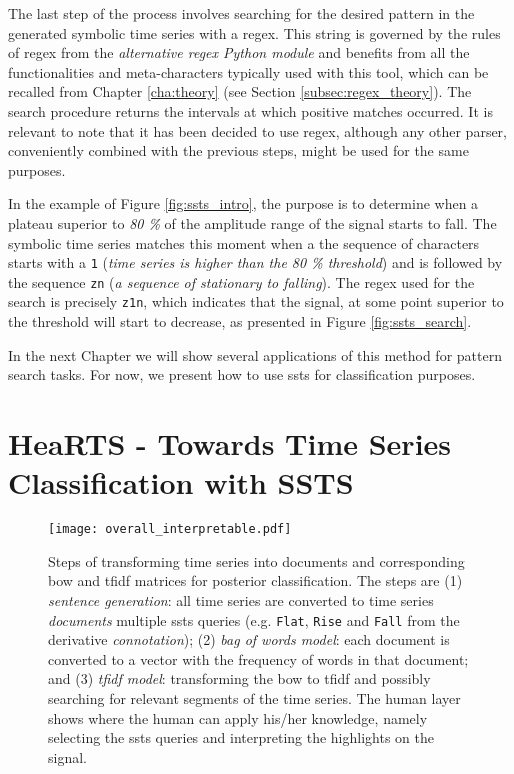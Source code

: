 The last step of the process involves searching for the desired pattern in the generated symbolic time series with a \gls{regex}. This string is governed by the rules of \gls{regex} from the \textit{alternative \gls{regex} Python module} \cite{rgxPy} and benefits from all the functionalities and meta-characters typically used with this tool, which can be recalled from Chapter \ref{cha:theory} (see Section \ref{subsec:regex_theory}). The search procedure returns the intervals at which positive matches occurred. It is relevant to note that it has been decided to use \gls{regex}, although any other parser, conveniently combined with the previous steps, might be used for the same purposes.
\par
In the example of Figure \ref{fig:ssts_intro}, the purpose is to determine when a plateau superior to \textit{80 \%} of the amplitude range of the signal starts to fall. The symbolic time series matches this moment when a the sequence of characters starts with a \texttt{1} (\textit{time series is higher than the 80 \% threshold}) and is followed by  the sequence \texttt{zn} (\textit{a sequence of stationary  to falling}). The \gls{regex} used for the search is precisely \texttt{z1n}, which indicates that the signal, at some point superior to the threshold will start to decrease, as presented in Figure \ref{fig:ssts_search}.
\par
In the next Chapter we will show several applications of this method for pattern search tasks. For now, we present how  to use \gls{ssts} for classification purposes.

\section{HeaRTS - Towards Time Series Classification with SSTS}
\label{sec:hearts}

\begin{figure}[b]
\centering
\texttt{[image: overall\_interpretable.pdf]}
\caption{Steps of transforming time series into documents and corresponding \gls{bow} and \gls{tfidf} matrices for posterior classification. The steps are (1) \textit{sentence generation}: all time series are converted to time series \textit{documents} multiple \gls{ssts} queries (e.g. \texttt{Flat}, \texttt{Rise} and \texttt{Fall} from the derivative \textit{connotation}); (2) \textit{bag of words model}: each document is converted to a vector with the frequency of words in that document; and (3) \textit{tfidf model}: transforming the \gls{bow} to \gls{tfidf} and possibly searching for relevant segments of the time series. The human layer shows where the human can apply his/her knowledge, namely selecting the \gls{ssts} queries and interpreting the highlights on the signal.}
\label{fig:overall_interpretable}
\end{figure}

